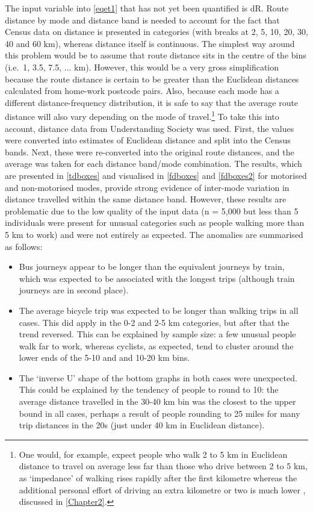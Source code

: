 The input variable into \cref{eqet1} that has not yet been quantified is
dR. Route distance by mode and distance band
is needed to account for the fact that Census data on distance is presented in
categories (with breaks at 2, 5, 10, 20, 30, 40 and 60 km), whereas distance
itself is continuous. The simplest way around this problem would be to
assume that route distance sits in the centre of the bins (i.e.~1, 3.5, 7.5, ...
km). However, this would be a very gross simplification because the route distance
is certain to be greater than the Euclidean distances calculated from
home-work postcode pairs. Also, because each mode has a different
distance-frequency distribution,
it is safe to say that the average route distance will also vary depending
on the mode of travel.\footnote{One would, for example,
expect people who walk 2 to 5
km in Euclidean distance to travel on average less far than those who drive
between 2 to 5 km, as `impedance' of walking rises rapidly after the first
kilometre whereas the additional personal effort of driving
an extra kilometre or two is much lower
\citep{Iacono2010}, discussed in \cref{Chapter2}.
}
To take this into account, distance data from Understanding Society was used.
First, the values were converted into estimates of Euclidean distance and
split into the Census bands. Next, these were re-converted into the original
route distances, and the average was taken for each distance band/mode
combination. The results, which are presented in \cref{tdboxes} and visualised in 
\cref{fdboxes} and \cref{fdboxes2} for motorised and non-motorised modes,
provide strong evidence of inter-mode variation in distance travelled within
the same distance band. However, these results are problematic due to the
low quality of the input data (n = 5,000 but less than 5 individuals
were present for unusual
categories such as people walking more than 5 km to work) and were not entirely
as expected. The anomalies are summarised as follows:
\begin{itemize}
 \item Bus journeys appear to be longer than the equivalent journeys by train,
 which was expected to be associated with the longest trips (although train
 journeys are in second place).
 \item The average bicycle trip was expected to be longer than walking trips
 in all cases. This did apply in the 0-2 and 2-5 km categories, but after that
 the trend reversed. This can be explained by sample size: a few unusual people
 walk far to work, whereas cyclists, as expected, tend to cluster around the lower
 ends of the 5-10 and and 10-20 km bins.
 \item The `inverse U' shape of the bottom graphs in both cases were unexpected.
 This could be explained by the tendency of people to round to 10: the
 average distance travelled in the 30-40 km bin was the closest to the upper
 bound in all cases, perhaps a result of people rounding to 25 miles for many
 trip distances in the 20s (just under 40 km in Euclidean distance).
\end{itemize}
